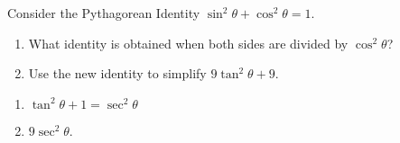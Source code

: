 {Consider the Pythagorean Identity $\sin^2\theta+\cos^2\theta = 1$.
		\begin{enumerate}
			\item What identity is obtained when both sides are divided by $\cos^2\theta$?
			\item	Use the new identity to simplify $9\tan^2\theta + 9.$
		\end{enumerate}
}
{\begin{enumerate}
	\item $\tan^2\theta + 1 = \sec^2\theta$
	\item	$9\sec^2\theta$.
\end{enumerate}
}